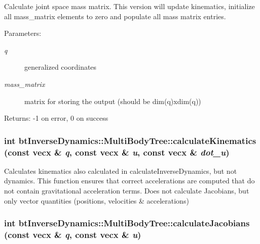 Calculate joint space mass matrix. This version will update kinematics, initialize all mass\_\-matrix elements to zero and populate all mass matrix entries. \begin{Desc}
\item[Parameters:]
\begin{description}
\item[{\em q}]generalized coordinates \item[{\em mass\_\-matrix}]matrix for storing the output (should be dim(q)xdim(q)) \end{description}
\end{Desc}
\begin{Desc}
\item[Returns:]-1 on error, 0 on success \end{Desc}
\hypertarget{classbt_inverse_dynamics_1_1_multi_body_tree_fa6df6ee25f28a4de404d82c6bbf78ff}{
\subsubsection[calculateKinematics]{\setlength{\rightskip}{0pt plus 5cm}int btInverseDynamics::MultiBodyTree::calculateKinematics (const vecx \& {\em q}, \/  const vecx \& {\em u}, \/  const vecx \& {\em dot\_\-u})}}
\label{classbt_inverse_dynamics_1_1_multi_body_tree_fa6df6ee25f28a4de404d82c6bbf78ff}


Calculates kinematics also calculated in calculateInverseDynamics, but not dynamics. This function ensures that correct accelerations are computed that do not contain gravitational acceleration terms. Does not calculate Jacobians, but only vector quantities (positions, velocities \& accelerations) \hypertarget{classbt_inverse_dynamics_1_1_multi_body_tree_b28d924ffc2226b224e2046497162227}{
\subsubsection[calculateJacobians]{\setlength{\rightskip}{0pt plus 5cm}int btInverseDynamics::MultiBodyTree::calculateJacobians (const vecx \& {\em q}, \/  const vecx \& {\em u})}}
\label{classbt_inverse_dynamics_1_1_multi_body_tree_b28d924ffc2226b224e2046497162227}


